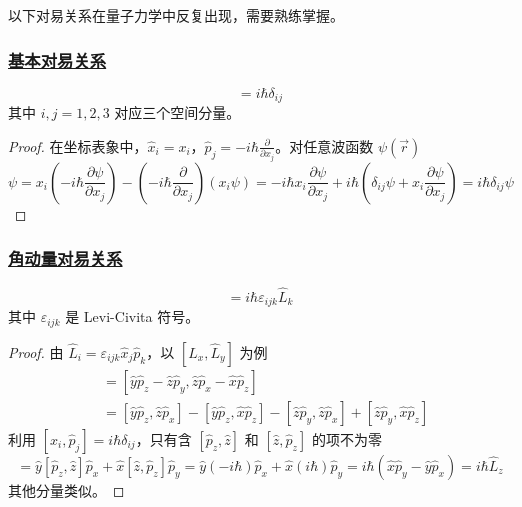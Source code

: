 以下对易关系在量子力学中反复出现，需要熟练掌握。

\subsubsection{\protect\hyperlink{:}{基本对易关系}}

\begin{theorem}[坐标-动量对易关系]
    \begin{equation}
        [\hat{x}_i, \hat{p}_j] = i\hbar\delta_{ij}
    \end{equation}
    其中 $i, j = 1, 2, 3$ 对应三个空间分量。
\end{theorem}

\begin{proof}
    在坐标表象中，$\hat{x}_i = x_i$，$\hat{p}_j = -i\hbar\frac{\partial}{\partial x_j}$。对任意波函数 $\psi(\vec{r})$
    \begin{equation}
        [\hat{x}_i, \hat{p}_j]\psi = x_i(-i\hbar\frac{\partial\psi}{\partial x_j}) - (-i\hbar\frac{\partial}{\partial x_j})(x_i\psi) = -i\hbar x_i\frac{\partial\psi}{\partial x_j} + i\hbar\left(\delta_{ij}\psi + x_i\frac{\partial\psi}{\partial x_j}\right) = i\hbar\delta_{ij}\psi
    \end{equation}
\end{proof}

\subsubsection{\protect\hyperlink{:}{角动量对易关系}}

\begin{theorem}[角动量分量之间的对易关系]
    \begin{equation}
        [\hat{L}_i, \hat{L}_j] = i\hbar\varepsilon_{ijk}\hat{L}_k
    \end{equation}
    其中 $\varepsilon_{ijk}$ 是 Levi-Civita 符号。
\end{theorem}

\begin{proof}
    由 $\hat{L}_i = \varepsilon_{ijk}\hat{x}_j\hat{p}_k$，以 $[\hat{L}_x, \hat{L}_y]$ 为例
    \begin{align}
        [\hat{L}_x, \hat{L}_y] &= [\hat{y}\hat{p}_z - \hat{z}\hat{p}_y, \hat{z}\hat{p}_x - \hat{x}\hat{p}_z] \nonumber \\
        &= [\hat{y}\hat{p}_z, \hat{z}\hat{p}_x] - [\hat{y}\hat{p}_z, \hat{x}\hat{p}_z] - [\hat{z}\hat{p}_y, \hat{z}\hat{p}_x] + [\hat{z}\hat{p}_y, \hat{x}\hat{p}_z]
    \end{align}
    利用 $[\hat{x}_i, \hat{p}_j] = i\hbar\delta_{ij}$，只有含 $[\hat{p}_z, \hat{z}]$ 和 $[\hat{z}, \hat{p}_z]$ 的项不为零
    \begin{equation}
        [\hat{L}_x, \hat{L}_y] = \hat{y}[\hat{p}_z, \hat{z}]\hat{p}_x + \hat{x}[\hat{z}, \hat{p}_z]\hat{p}_y = \hat{y}(-i\hbar)\hat{p}_x + \hat{x}(i\hbar)\hat{p}_y = i\hbar(\hat{x}\hat{p}_y - \hat{y}\hat{p}_x) = i\hbar\hat{L}_z
    \end{equation}
    其他分量类似。
\end{proof}

